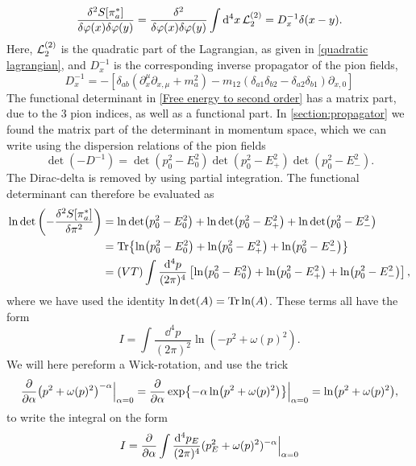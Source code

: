 \begin{align}
    \frac{\delta^2 S[\pi_a^*] }{\delta \varphi(x)\delta \varphi(y)}
    = \frac{\delta^2 }{\delta \varphi(x)\delta \varphi(y)} 
    \int \dd^4 x \, \mathcal{L}^{(2)}_2
    = D^{-1}_x \delta(x - y).
\end{align}
Here, $\mathcal{L}^{(2)}_2$ is the quadratic part of the Lagrangian, as given in \autoref{quadratic lagrangian}, and $D^{-1}_x$ is the corresponding inverse propagator of the pion fields,
\begin{equation}
    D_x^{-1} = 
    - \left[
        \delta_{ab}(\partial_x^\mu\partial_{x,\mu} + m^2_a)
        -  m_{12}(\delta_{a1} \delta_{b2} - \delta_{a2}\delta_{b1}) \partial_{x, 0}
    \right] 
\end{equation}
The functional determinant in \autoref{Free energy to second order} has a matrix part, due to the 3 pion indices, as well as a functional part.
In \autoref{section:propagator} we found the matrix part of  the determinant in momentum space, which we can write using the dispersion relations of the pion fields
\begin{equation}
    \det(- D^{-1}) = \det(p_0^2 - E_0^2) \det(p_0^2 - E_+^2) \det(p_0^2 - E_-^2).
\end{equation}
The Dirac-delta is removed by using partial integration.
The functional determinant can therefore be evaluated as
\begin{align}
    \nonumber
    \ln{\det\left( - \frac{\delta^2 S[\pi_a^*]}{\delta \pi^2} \right)}
    & = \ln \det(p_0^2 - E_0^2) + \ln \det(p_0^2 - E_+^2) + \ln \det(p_0^2 - E_-^2) \\
    \nonumber
    & = \Tr{ \ln(p_0^2 - E_0^2) + \ln(p_0^2 - E_+^2)+  \ln(p_0^2 - E_-^2) } \\
    & = (VT) \int \frac{\dd^4 p}{(2 \pi)^4} 
    \left[ \ln(p_0^2 - E_0^2) + \ln(p_0^2 - E_+^2) + \ln(p_0^2 - E_-^2)  \right],
\end{align}
where we have used the identity $\ln\det(A) = \Tr \ln (A)$.
These terms all have the form
\begin{equation}
    I = \int \frac{\dd^4 p}{(2 \pi)^2} \ln(-p^2 + \omega(p)^2).
\end{equation}
We will here pereform a Wick-rotation, and use the trick
\begin{equation}
    \pdv{\alpha} (p^2 + \omega(p)^2)^{-\alpha} \Big|_{\alpha=0}
    = \pdv{\alpha} \exp{-\alpha \ln(p^2 + \omega(p)^2) } \Big|_{\alpha=0}
    = \ln(p^2 + \omega(p)^2),
\end{equation}
to write the integral on the form
\begin{equation}
    I = \pdv{\alpha} \int \frac{\dd^4 p_E}{(2 \pi)^4} (p_E^2 + \omega(p)^2)^{-\alpha} \Big|_{\alpha=0}
\end{equation}

